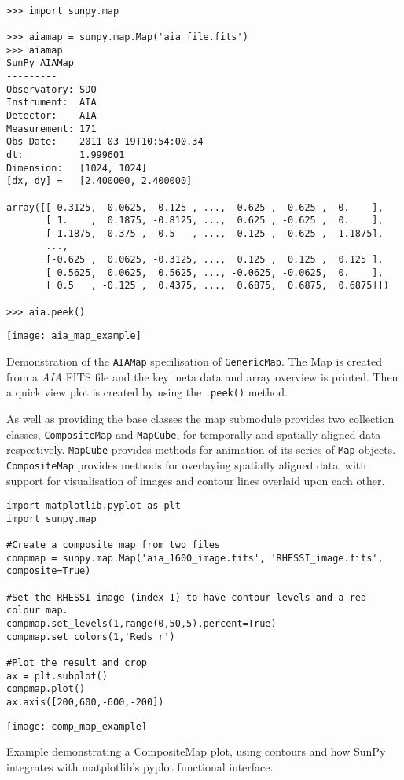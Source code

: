 \begin{listing}[H]
\begin{verbatim}

>>> import sunpy.map

>>> aiamap = sunpy.map.Map('aia_file.fits')
>>> aiamap
SunPy AIAMap
---------
Observatory: SDO
Instrument:  AIA
Detector:    AIA
Measurement: 171
Obs Date:    2011-03-19T10:54:00.34
dt:          1.999601
Dimension:   [1024, 1024]
[dx, dy] =   [2.400000, 2.400000]

array([[ 0.3125, -0.0625, -0.125 , ...,  0.625 , -0.625 ,  0.    ],
       [ 1.    ,  0.1875, -0.8125, ...,  0.625 , -0.625 ,  0.    ],
       [-1.1875,  0.375 , -0.5   , ..., -0.125 , -0.625 , -1.1875],
       ..., 
       [-0.625 ,  0.0625, -0.3125, ...,  0.125 ,  0.125 ,  0.125 ],
       [ 0.5625,  0.0625,  0.5625, ..., -0.0625, -0.0625,  0.    ],
       [ 0.5   , -0.125 ,  0.4375, ...,  0.6875,  0.6875,  0.6875]])

>>> aia.peek()
\end{verbatim}
\texttt{[image: aia\_map\_example]}
\caption{Demonstration of the \texttt{AIAMap} specilisation of 
\texttt{GenericMap}. The Map is created from a \textit{AIA} FITS file and the 
key meta data and array overview is printed. Then a quick view plot is created 
by using the \texttt{.peek()} method.}
\label{code:aia_1}
\end{listing}

As well as providing the base classes the map submodule provides two 
collection classes, \texttt{CompositeMap} and \texttt{MapCube}, for 
temporally and spatially aligned data respectively. \texttt{MapCube} 
provides methods for animation of its series of \texttt{Map} objects. 
\texttt{CompositeMap} provides methods for overlaying spatially aligned 
data, with support for visualisation of images and contour lines overlaid 
upon each other.

\begin{listing}[H]
\begin{verbatim}
import matplotlib.pyplot as plt
import sunpy.map

#Create a composite map from two files
compmap = sunpy.map.Map('aia_1600_image.fits', 'RHESSI_image.fits', 
composite=True)

#Set the RHESSI image (index 1) to have contour levels and a red colour map.
compmap.set_levels(1,range(0,50,5),percent=True)
compmap.set_colors(1,'Reds_r')

#Plot the result and crop
ax = plt.subplot()
compmap.plot()
ax.axis([200,600,-600,-200])
\end{verbatim}
\texttt{[image: comp\_map\_example]}
\caption{Example demonstrating a CompositeMap plot, using contours and how 
SunPy integrates with matplotlib's pyplot functional interface.}
\label{code:compmap_1}
\end{listing}


